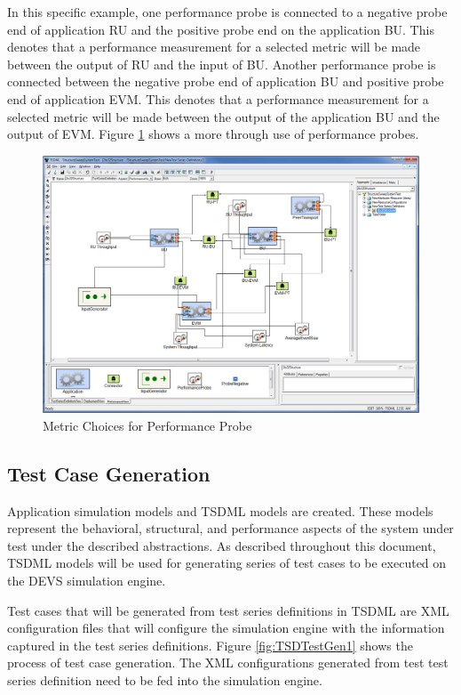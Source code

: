 In this specific example, one performance probe is connected to a negative probe end of application RU and the positive probe end on the application BU. This denotes that a performance measurement for a selected metric will be made between the output of RU and the input of BU. Another performance probe is connected between the negative probe end of application BU and positive probe end of application EVM. This denotes that a performance measurement for a selected metric will be made between the output of the application BU and the output of EVM. Figure \ref{fig:TSDProbeAdv} shows a more through use of performance probes.

\begin{figure}
	\centering
		\includegraphics[width=1.00\textwidth]{figures/TSDProbeAdv.png}
	\caption{Metric Choices for Performance Probe}
	\label{fig:TSDProbeAdv}
\end{figure}

\subsection{Test Case Generation}
Application simulation models and TSDML models are created. These models represent the behavioral, structural, and performance aspects of the system under test under the described abstractions. As described throughout this document, TSDML models will be used for generating series of test cases to be executed on the DEVS simulation engine. 

Test cases that will be generated from test series definitions in TSDML are XML configuration files that will configure the simulation engine with the information captured in the test series definitions. Figure \ref{fig:TSDTestGen1} shows the process of test case generation. The XML configurations generated from test test series definition need to be fed into the simulation engine.

